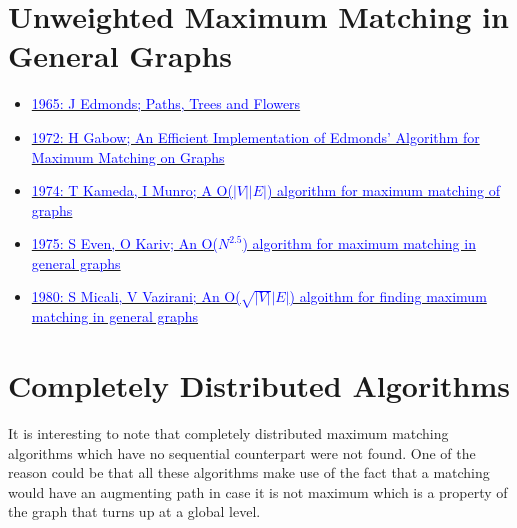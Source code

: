 \documentclass[oneside]{book}
\begin{document}
\section{Unweighted Maximum Matching in General Graphs}
\begin{itemize}
    \item \href{https://link.springer.com/chapter/10.1007/978-0-8176-4842-8_26}{\textcolor{blue}{1965: J Edmonds; Paths, Trees and Flowers}}
    \item \href{https://dl.acm.org/doi/10.1145/321941.321942}{\textcolor{blue}{1972: H Gabow; An Efficient Implementation of Edmonds' Algorithm for Maximum Matching on Graphs}}
    \item \href{https://link.springer.com/article/10.1007/BF02239502}{\textcolor{blue}{1974: T Kameda, I Munro; A O($|V||E|$) algorithm for maximum matching of graphs}}
    \item \href{https://dl.acm.org/doi/10.1109/SFCS.1975.5}{\textcolor{blue}{1975: S Even, O Kariv; An O($N^{2.5}$) algorithm for maximum matching in general graphs}}
    \item \href{https://dl.acm.org/doi/10.1109/SFCS.1980.12}{\textcolor{blue}{1980: S Micali, V Vazirani; An O($\sqrt{|V|}|E|$) algoithm for finding maximum matching in general graphs}}
\end{itemize}

\section{Completely Distributed Algorithms}
It is interesting to note that completely distributed maximum matching algorithms which have no sequential counterpart were not found. One of the reason could be that all these algorithms make use of the fact that a matching would have an augmenting path in case it is not maximum which is a property of the graph that turns up at a global level.
\end{document}
